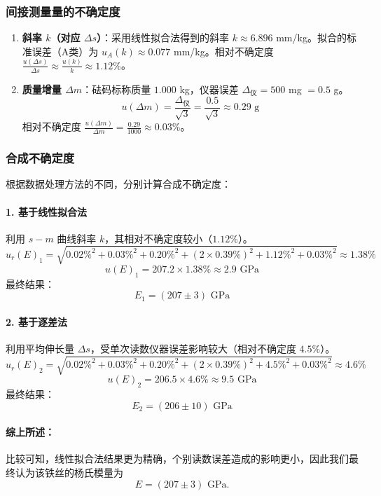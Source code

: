 \documentclass[]{../template/Report}%
\begin{document}
\begin{fullreportonly}
\subsubsection{间接测量量的不确定度}
\begin{enumerate}
    \item \textbf{斜率 $k$（对应 $\Delta s$）}：采用线性拟合法得到的斜率 $k \approx 6.896$ mm/kg。拟合的标准误差（A类）为 $u_A(k) \approx 0.077$ mm/kg。相对不确定度 $\frac{u(\Delta s)}{\Delta s} \approx \frac{u(k)}{k} \approx 1.12\%$。
    \item \textbf{质量增量 $\Delta m$}：砝码标称质量 $1.000$ kg，仪器误差 $\Delta_{\text{仪}} = 500$ mg $= 0.5$ g。
    \[ u(\Delta m) = \frac{\Delta_{\text{仪}}}{\sqrt{3}} = \frac{0.5}{\sqrt{3}} \approx 0.29 \text{ g} \]
    相对不确定度 $\frac{u(\Delta m)}{\Delta m} = \frac{0.29}{1000} \approx 0.03\%$。
\end{enumerate}

\subsubsection{合成不确定度}
根据数据处理方法的不同，分别计算合成不确定度：

\paragraph{1. 基于线性拟合法}
利用 $s-m$ 曲线斜率 $k$，其相对不确定度较小（$1.12\%$）。
\[ u_r(E)_1 = \sqrt{0.02\%^2 + 0.03\%^2 + 0.20\%^2 + (2\times 0.39\%)^2 + 1.12\%^2 + 0.03\%^2} \approx 1.38\% \]
\[ u(E)_1 = 207.2 \times 1.38\% \approx 2.9 \text{ GPa} \]
最终结果：
$$\boxed{E_1 = (207 \pm 3) \text{ GPa}}$$

\paragraph{2. 基于逐差法}
利用平均伸长量 $\Delta s$，受单次读数仪器误差影响较大（相对不确定度 $4.5\%$）。
\[ u_r(E)_2 = \sqrt{0.02\%^2 + 0.03\%^2 + 0.20\%^2 + (2\times 0.39\%)^2 + 4.5\%^2 + 0.03\%^2} \approx 4.6\% \]
\[ u(E)_2 = 206.5 \times 4.6\% \approx 9.5 \text{ GPa} \]
最终结果：
$$\boxed{E_2 = (206 \pm 10) \text{ GPa}}$$

\paragraph{综上所述：}比较可知，线性拟合法结果更为精确，个别读数误差造成的影响更小，因此我们最终认为该铁丝的杨氏模量为
$$\boxed{E = (207 \pm 3) \text{ GPa}}.$$


\end{fullreportonly}
\end{document}
